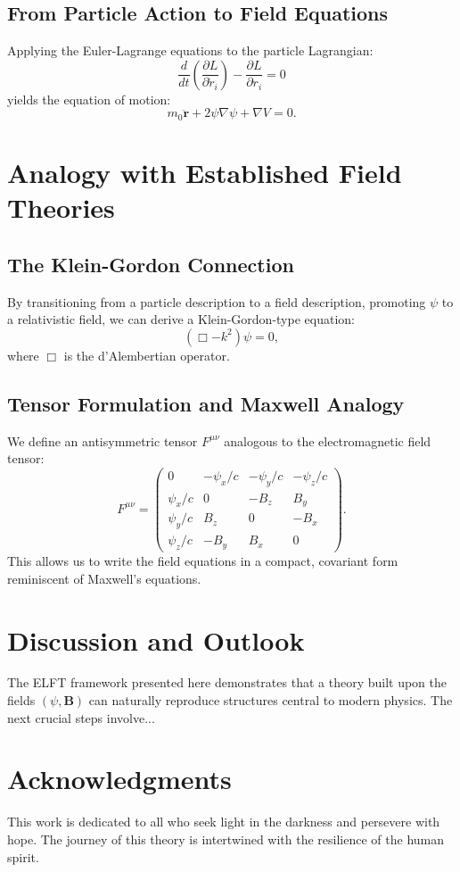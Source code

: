 \documentclass[12pt, a4paper]{article}
\begin{document}
\subsection{From Particle Action to Field Equations}
Applying the Euler-Lagrange equations to the particle Lagrangian:
\[
\frac{d}{dt}\left( \frac{\partial L}{\partial \dot{r}_i} \right) - \frac{\partial L}{\partial r_i} = 0
\]
yields the equation of motion:
\begin{equation}
m_0 \ddot{\mathbf{r}} + 2\psi \nabla \psi + \nabla V = 0.
\end{equation}

\section{Analogy with Established Field Theories}

\subsection{The Klein-Gordon Connection}
By transitioning from a particle description to a field description, promoting $\psi$ to a relativistic field, we can derive a Klein-Gordon-type equation:
\begin{equation}
\left( \Box - k^2 \right)\psi = 0,
\end{equation}
where $\Box$ is the d'Alembertian operator.

\subsection{Tensor Formulation and Maxwell Analogy}
We define an antisymmetric tensor $F^{\mu\nu}$ analogous to the electromagnetic field tensor:
\[
F^{\mu\nu} = \begin{pmatrix}
0 & -\psi_x/c & -\psi_y/c & -\psi_z/c \\
\psi_x/c & 0 & -B_z & B_y \\
\psi_y/c & B_z & 0 & -B_x \\
\psi_z/c & -B_y & B_x & 0
\end{pmatrix}.
\]
This allows us to write the field equations in a compact, covariant form reminiscent of Maxwell's equations.

\section{Discussion and Outlook}
The ELFT framework presented here demonstrates that a theory built upon the fields $(\psi, \mathbf{B})$ can naturally reproduce structures central to modern physics. The next crucial steps involve...

\section*{Acknowledgments}
This work is dedicated to all who seek light in the darkness and persevere with hope. The journey of this theory is intertwined with the resilience of the human spirit.
\end{document}
